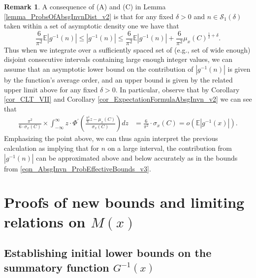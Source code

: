 \documentclass[11pt,reqno,a4letter]{article}
\numberwithin{figure}{section}
\numberwithin{table}{section}
\theoremstyle{plain}
\numberwithin{theorem}{section}
\theoremstyle{definition}
\newtheorem{remark}[theorem]{Remark}
\begin{document}
\begin{remark} 
\label{remark_ProbsOfAbsgInvnDist_v3} 
A consequence of (A) and (C) in Lemma \ref{lemma_ProbsOfAbsgInvnDist_v2} 
is that for any fixed $\delta > 0$ and $n \in \mathcal{S}_1(\delta)$ 
taken within a set of asymptotic density one we have that 
\begin{equation} 
\label{eqn_AbsgInvn_ProbEffectiveBounds_v3} 
\frac{6}{\pi^2}\mathbb{E}|g^{-1}(n)| \leq |g^{-1}(n)| \leq \frac{6}{\pi^2}\mathbb{E}|g^{-1}(n)| + \frac{6}{\pi^2} 
     \mu_x(C)^{\frac{1}{2} + \delta}. 
\end{equation} 
Thus when we integrate over a sufficiently spaced set of (e.g., set of wide enough) 
disjoint consecutive intervals 
containing large enough integer values, 
we can assume that an asymptotic lower bound on the 
contribution of $|g^{-1}(n)|$ is given by the function's average 
order, and an upper bound is given by the related 
upper limit above for any fixed $\delta > 0$. 
In particular, observe that by 
Corollary \ref{cor_CLT_VII} and 
Corollary \ref{cor_ExpectationFormulaAbsgInvn_v2} 
we can see that 
\begin{align*} 
\frac{\pi^2}{6 \cdot \sigma_x(C)} \times \int_{-\infty}^{\infty} z \cdot 
     \Phi^{\prime}\left(\frac{\frac{\pi^2}{6} z - \mu_x(C)}{\sigma_x(C)}\right) dz & = 
     \frac{6}{\pi^2} \cdot \sigma_x(C) = o\left(\mathbb{E}|g^{-1}(x)|\right). 
\end{align*} 
Emphasizing the point above, 
we can thus again interpret the previous calculation as implying that for $n$ on a large 
interval, the contribution from $|g^{-1}(n)|$ can be approximated above and below 
accurately as in the bounds from \eqref{eqn_AbsgInvn_ProbEffectiveBounds_v3}. 
\end{remark} 

\newpage 
\section{Proofs of new bounds and limiting relations on $M(x)$} 
\label{Section_KeyApplications} 

\subsection{Establishing initial lower bounds on the summatory function $G^{-1}(x)$} 
\label{Section_ProofOfValidityOfAverageOrderLowerBounds} 
\end{document}

